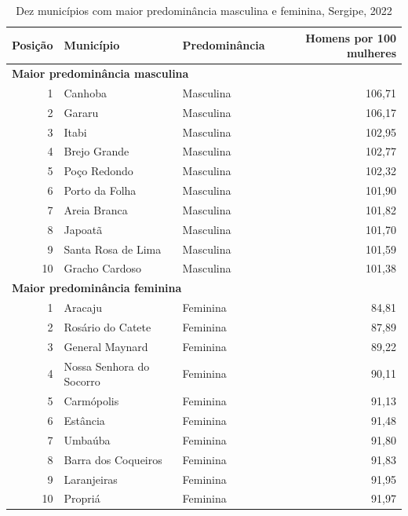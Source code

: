\begin{table}[htbp]
\centering
\caption{Dez municípios com maior predominância masculina e feminina, Sergipe, 2022}
\label{tab:razao-sexo-top10}
\small
\begin{tabular}{r l l r}
\toprule
Posição & Município & Predominância & Homens por 100 mulheres \\
\midrule
\multicolumn{4}{l}{\textbf{Maior predominância masculina}} \\
1 & Canhoba & Masculina & 106,71 \\
2 & Gararu & Masculina & 106,17 \\
3 & Itabi & Masculina & 102,95 \\
4 & Brejo Grande & Masculina & 102,77 \\
5 & Poço Redondo & Masculina & 102,32 \\
6 & Porto da Folha & Masculina & 101,90 \\
7 & Areia Branca & Masculina & 101,82 \\
8 & Japoatã & Masculina & 101,70 \\
9 & Santa Rosa de Lima & Masculina & 101,59 \\
10 & Gracho Cardoso & Masculina & 101,38 \\
\midrule
\multicolumn{4}{l}{\textbf{Maior predominância feminina}} \\
1 & Aracaju & Feminina & 84,81 \\
2 & Rosário do Catete & Feminina & 87,89 \\
3 & General Maynard & Feminina & 89,22 \\
4 & Nossa Senhora do Socorro & Feminina & 90,11 \\
5 & Carmópolis & Feminina & 91,13 \\
6 & Estância & Feminina & 91,48 \\
7 & Umbaúba & Feminina & 91,80 \\
8 & Barra dos Coqueiros & Feminina & 91,83 \\
9 & Laranjeiras & Feminina & 91,95 \\
10 & Propriá & Feminina & 91,97 \\
\bottomrule
\end{tabular}
\end{table}
